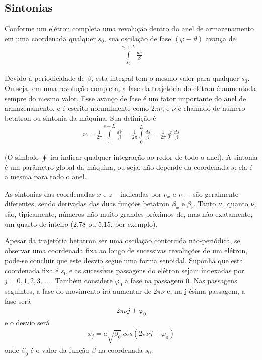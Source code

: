 \subsection{Sintonias}
Conforme um elétron completa uma revolução dentro do anel de armazenamento em uma coordenada qualquer $s_0$, sua oscilação de fase $(\varphi - \vartheta)$ avança de
\begin{align}
	\int\limits_{s_0}^{s_0+L}\frac{ds}{\beta}
\end{align}

Devido à periodicidade de $\beta$, esta integral tem o mesmo valor para qualquer $s_0$. Ou seja, em uma revolução completa, a fase da trajetória do elétron é aumentada sempre do mesmo valor. Esse avanço de fase é um fator importante do anel de armazenamento, e é escrito normalmente como $2\pi \nu$, e $\nu$ é chamado de número betatron ou sintonia da máquina. Sua definição é
\begin{align}
	\nu = \frac{1}{2 \pi}\int\limits_{s}^{s+L}\frac{d\bar{s}}{\beta} = \frac{1}{2 \pi}\int\limits_{0}^{L}\frac{ds}{\beta} = \frac{1}{2\pi}\oint \frac{ds}{\beta}\label{eq:2.60}
\end{align}

(O símbolo $\oint$ irá indicar qualquer integração ao redor de todo o anel).
A sintonia é um parâmetro global da máquina, ou seja, não depende da coordenada $s$: ela é a mesma para todo o anel.

As sintonias das coordenadas $x$ e $z$ -- indicadas por $\nu_x$ e $\nu_z$ -- são geralmente diferentes, sendo derivadas das duas funções betatron $\beta_x$ e $\beta_z$. Tanto $\nu_x$ quanto $\nu_z$ são, tipicamente, números não muito grandes próximos de, mas não exatamente, um quarto de inteiro (2.78 ou 5.15, por exemplo). 

Apesar da trajetória betatron ser uma oscilação contorcida não-periódica, se observar uma coordenada fixa ao longo de sucessivas revoluções de um elétron, pode-se concluir que este desvio segue uma forma senoidal. Suponha que esta coordenada fixa é $s_0$ e as sucessivas passagens do elétron sejam indexadas por $j=0,1,2,3,\ ...$. Também considere $\varphi_0$ a fase na passagem 0. Nas passagens seguintes, a fase do movimento irá aumentar de $2\pi\nu$ e, na j-ésima passagem, a fase será
\begin{align}
	2\pi\nu j+ \varphi_0
\end{align}
e o desvio será
\begin{align}
	x_j = a\sqrt{\beta_0}\ cos(2\pi\nu j+ \varphi_0)\label{eq:2.61}
\end{align}
onde $\beta_0$ é o valor da função $\beta$ na coordenada $s_0$.


